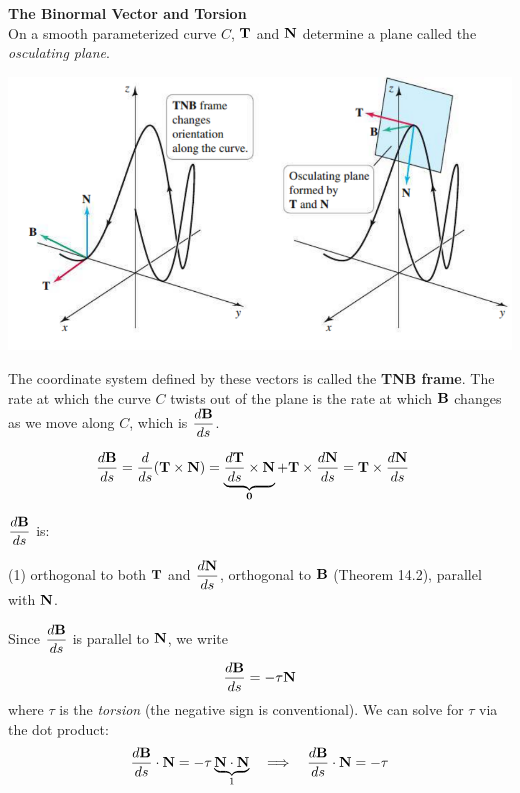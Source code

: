 \documentclass[mathNotesPreamble]{subfiles}
\begin{document}
  \textbf{The Binormal Vector and Torsion}\\
  On a smooth parameterized curve $C$, ${\mathbf{T}}$ and ${\mathbf{N}}$ determine a plane called the \textit{osculating plane}. 
  
  \begin{center}
    \includegraphics[width=0.6\linewidth]{images/briggs_14_05/fig14_37}
  \end{center}
  
  The coordinate system defined by these vectors is called the \textbf{TNB frame}. The rate at which the curve $C$ twists out of the plane is the rate at which ${\mathbf{B}}$ changes as we move along $C$, which is $\displaystyle\frac{d{\mathbf{B}}}{ds}$.

  \begin{align*}
    \frac{d{\mathbf{B}}}{ds}&= \frac{d}{ds}{\left({\mathbf{T}}\times{\mathbf{N}}\right)}
      =\underbrace{\frac{d{\mathbf{T}}}{ds}\times{\mathbf{N}}}_{\mathbf{0}}+{\mathbf{T}}\times \frac{d{\mathbf{N}}}{ds}
      ={\mathbf{T}}\times \frac{d{\mathbf{N}}}{ds}
  \end{align*}

  $\displaystyle\frac{d{\mathbf{B}}}{ds}$ is:
  \begin{tasks}[label=\textbullet](1)
    \task orthogonal to both ${\mathbf{T}}$ and $\displaystyle\frac{d{\mathbf{N}}}{ds}$,
    \task orthogonal to ${\mathbf{B}}$ (Theorem 14.2),
    \task parallel with ${\mathbf{N}}$.
  \end{tasks}
  \pagebreak

  Since $\displaystyle\frac{d{\mathbf{B}}}{ds}$ is parallel to ${\mathbf{N}}$, we write
    \[\frac{d{\mathbf{B}}}{ds}=-\tau{\mathbf{N}}\]
  where $\tau$ is the \textit{torsion} (the negative sign is conventional). We can solve for $\tau$ via the dot product:
  \begin{align*}
    \frac{d{\mathbf{B}}}{ds}\cdot{\mathbf{N}}=-\tau \underbrace{{\mathbf{N}}\cdot{\mathbf{N}}}_1 \quad\Longrightarrow\quad
    \frac{d{\mathbf{B}}}{ds}\cdot{\mathbf{N}}=-\tau
  \end{align*}
\end{document}
